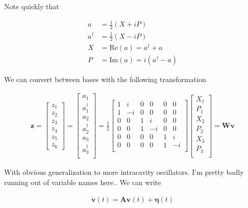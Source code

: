 \documentclass[12pt]{article}
\newcommand{\bv}[1]{\boldsymbol{#1}}
\begin{document}
Note quickly that

\begin{align}
a &= \frac{1}{2}(X+iP)\\
a^{\dag} &= \frac{1}{2}(X-iP)\\
X&=\text{Re}(a) = a^{\dag} + a\\
P&=\text{Im}(a) = i(a^{\dag}-a)
\end{align}


We can convert between bases with the following transformation

\begin{align}
\bv{z} = 
\begin{bmatrix}
z_1\\
z_2\\
z_3\\
z_4\\
z_5\\
z_6
\end{bmatrix}
=
\begin{bmatrix}
a_1\\
a_1^{\dag}\\
a_2\\
a_2^{\dag}\\
a_3\\
a_3^{\dag}\\
\end{bmatrix}
=
\frac{1}{2}
\begin{bmatrix}
1 & i & 0 & 0 & 0 & 0\\
1 & -i & 0 & 0 & 0 & 0\\
0 & 0 & 1 & i & 0 & 0\\
0 & 0 & 1 & -i & 0 & 0\\
0 & 0 & 0 & 0 & 1 & i\\
0 & 0 & 0 & 0 & 1 & -i\\
\end{bmatrix}
\begin{bmatrix}
X_1\\
P_1\\
X_2\\
P_2\\
X_3\\
P_3\\
\end{bmatrix}
=
\bv{W}\bv{v}
\end{align}


With obvious generalization to more intracavity oscillators. I'm pretty badly running out of variable names here.. We can write

\begin{align}
\dot{\bv{v}}(t) = \bv{A} \bv{v}(t) + \bv{\eta}(t)
\end{align}
\end{document}
